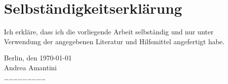 \thispagestyle{empty}
\section*{Selbst\"andigkeitserkl\"arung}

Ich erkl\"are, dass ich die vorliegende Arbeit selbst\"andig und nur unter Verwendung der angegebenen Literatur und Hilfsmittel angefertigt habe.



\vspace{2\baselineskip}
\noindent Berlin, den \today\\
Andrea Amantini\\[+7mm]
\dots\dots\dots\dots\dots\dots\dots\dots\dots
